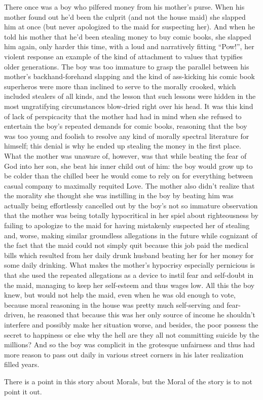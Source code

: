 \documentclass{article}
\begin{document}
\newline

There once was a boy who pilfered money from his mother's purse. When
his mother found out he'd been the culprit (and not the house maid) she
slapped him at once (but never apologized to the maid for suspecting
her). And when he told his mother that he'd been stealing money to buy
comic books, she slapped him again, only harder this time, with a loud
and narratively fitting ``Pow!'', her violent response an example of the
kind of attachment to values that typifies older generations. The boy
was too immature to grasp the parallel between his mother's
backhand-forehand slapping and the kind of ass-kicking his comic book
superheros were more than inclined to serve to the morally crooked,
which included stealers of all kinds, and the lesson that such lessons
were hidden in the most ungratifying circumstances blow-dried right over
his head. It was this kind of lack of perspicacity that the mother had
had in mind when she refused to entertain the boy's repeated demands for
comic books, reasoning that the boy was too young and foolish to resolve
any kind of morally spectral literature for himself; this denial is why
he ended up stealing the money in the first place. What the mother was
unaware of, however, was that while beating the fear of God into her
son, she beat his inner child out of him: the boy would grow up to be
colder than the chilled beer he would come to rely on for everything
between casual company to maximally requited Love. The mother also
didn't realize that the morality she thought she was instilling in the
boy by beating him was actually being effortlessly cancelled out by the
boy's not so immature observation that the mother was being totally
hypocritical in her spiel about righteousness by failing to apologize to
the maid for having mistakenly suspected her of stealing and, worse,
making similar groundless allegations in the future while cognizant of
the fact that the maid could not simply quit because this job paid the
medical bills which resulted from her daily drunk husband beating her
for her money for some daily drinking. What makes the mother's hypocrisy
especially pernicious is that she used the repeated allegations as
a device to instil fear and self-doubt in the maid, managing to keep her
self-esteem and thus wages low. All this the boy knew, but would not
help the maid, even when he was old enough to vote, because moral
reasoning in the house was pretty much self-serving and fear-driven, he
reasoned that because this was her only source of income he shouldn't
interfere and possibly make her situation worse, and besides, the poor
possess the secret to happiness or else why the hell are they all not
committing suicide by the millions? And so the boy was complicit in the
grotesque unfairness and thus had more reason to pass out daily in
various street corners in his later realization filled years.

\newline\newline

There is a point in this story about Morals, but the Moral of the story
is to not point it out.
\end{document}
